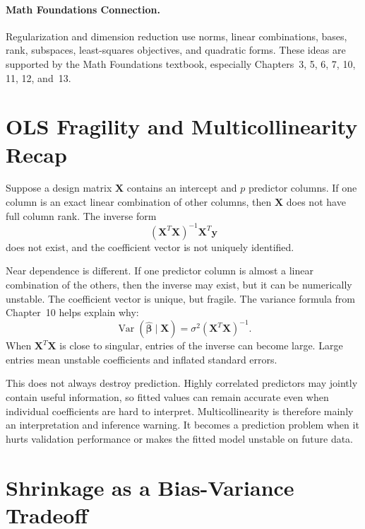 \paragraph{Math Foundations Connection.}
Regularization and dimension reduction use norms, linear combinations, bases, rank, subspaces, least-squares objectives, and quadratic forms.  These ideas are supported by the Math Foundations textbook, especially Chapters~3, 5, 6, 7, 10, 11, 12, and~13.

\section{OLS Fragility and Multicollinearity Recap}

Suppose a design matrix \(\mathbf{X}\) contains an intercept and \(p\) predictor columns.  If one column is an exact linear combination of other columns, then \(\mathbf{X}\) does not have full column rank.  The inverse form
\begin{equation}
  (\mathbf{X}^T\mathbf{X})^{-1}\mathbf{X}^T\mathbf{y}
\end{equation}
does not exist, and the coefficient vector is not uniquely identified.

Near dependence is different.  If one predictor column is almost a linear combination of the others, then the inverse may exist, but it can be numerically unstable.  The coefficient vector is unique, but fragile.  The variance formula from Chapter~10 helps explain why:
\begin{equation}
  \operatorname{Var}(\widehat{\boldsymbol{\beta}}\mid \mathbf{X})
  =\sigma^2(\mathbf{X}^T\mathbf{X})^{-1}.
\end{equation}
When \(\mathbf{X}^T\mathbf{X}\) is close to singular, entries of the inverse can become large.  Large entries mean unstable coefficients and inflated standard errors.

This does not always destroy prediction.  Highly correlated predictors may jointly contain useful information, so fitted values can remain accurate even when individual coefficients are hard to interpret.  Multicollinearity is therefore mainly an interpretation and inference warning.  It becomes a prediction problem when it hurts validation performance or makes the fitted model unstable on future data.

\section{Shrinkage as a Bias-Variance Tradeoff}

